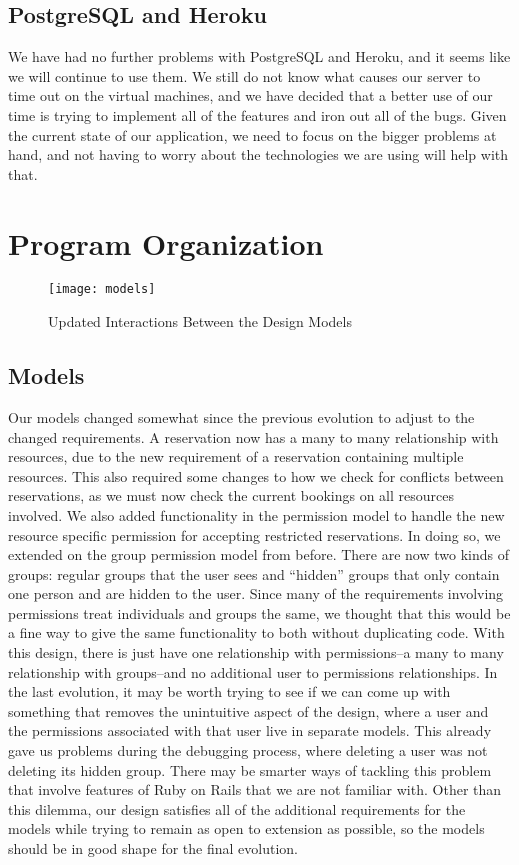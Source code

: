 \documentclass{article}
\begin{document}
\subsection{PostgreSQL and Heroku}
We have had no further problems with PostgreSQL and Heroku, and it seems like we will continue to use them.  We still do not know what causes our server to time out on the virtual machines, and we have decided that a better use of our time is trying to implement all of the features and iron out all of the bugs.  Given the current state of our application, we need to focus on the bigger problems at hand, and not having to worry about the technologies we are using will help with that.
\section{Program Organization}
\begin{figure}[h]
\centering
\texttt{[image: models]}
\caption{Updated Interactions Between the Design Models}
\end{figure}
\subsection{Models}
Our models changed somewhat since the previous evolution to adjust to the changed requirements. A reservation now has a many to many relationship with resources, due to the new requirement of a reservation containing multiple resources. This also required some changes to how we check for conflicts between reservations, as we must now check the current bookings on all resources involved. We also added functionality in the permission model to handle the new resource specific permission for accepting restricted reservations. In doing so, we extended on the group permission model from before. There are now two kinds of groups: regular groups that the user sees and ``hidden'' groups that only contain one person and are hidden to the user.  Since many of the requirements involving permissions treat individuals and groups the same, we thought that this would be a fine way to give the same functionality to both without duplicating code.  With this design, there is just have one relationship with permissions--a many to many relationship with groups--and no additional user to permissions relationships.  In the last evolution, it may be worth trying to see if we can come up with something that removes the unintuitive aspect of the design, where a user and the permissions associated with that user live in separate models.  This already gave us problems during the debugging process, where deleting a user was not deleting its hidden group.  There may be smarter ways of tackling this problem that involve features of Ruby on Rails that we are not familiar with.  Other than this dilemma, our design satisfies all of the additional requirements for the models while trying to remain as open to extension as possible, so the models should be in good shape for the final evolution.
\end{document}
